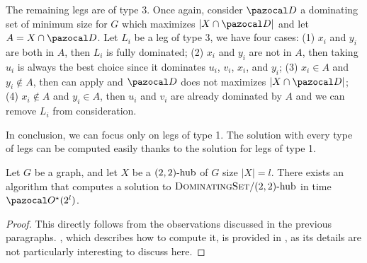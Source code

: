 \medskip

The remaining legs are of type 3. Once again, consider $\D$ a dominating set of minimum size for $G$ which maximizes $|X \cap \D|$ and let $A = X \cap \D$. Let $L_i$ be a leg of type 3, we have four cases: (1) $x_i$ and $y_i$ are both in $A$, then $L_i$ is fully dominated; (2) $x_i$ and $y_i$ are not in $A$, then taking $u_i$ is always the best choice since it dominates $u_i$, $v_i$, $x_i$, and $y_i$; (3) $x_i \in A$ and $y_i \notin A$, then  can apply and $\D$ does not maximizes $|X \cap \D|$; (4) $x_i \notin A$ and $y_i \in A$, then $u_i$ and $v_i$ are already dominated by $A$ and we can remove $L_i$ from consideration.

\medskip

In conclusion, we can focus only on legs of type 1. The solution with every type of legs can be computed easily thanks to the solution for legs of type 1.

\begin{theorem}
    \label{theorem:domset-22-alltypes}
    Let $G$ be a graph, and let $X$ be a $\sdhub[2,2]$ of $G$ size $|X| = l$. There exists an algorithm that computes a solution to $\prob{DominatingSet}/\sdhub[2,2]$ in time $\O^\star(2^l)$.
\end{theorem}

\begin{proof}
    This directly follows from the observations discussed in the previous paragraphs. , which describes how to compute it, is provided in , as its details are not particularly interesting to discuss here.
\end{proof}